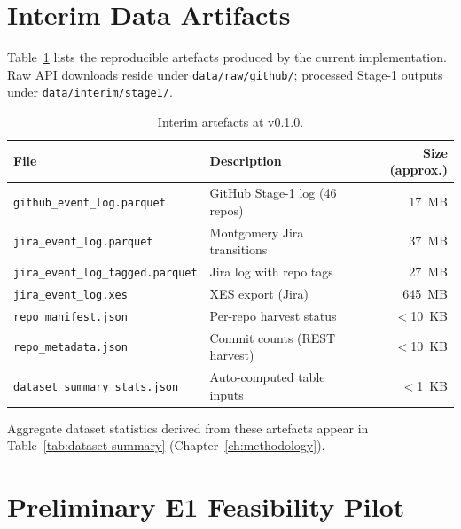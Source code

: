 \section{Interim Data Artifacts}
\label{sec:impl-artifacts}

Table~\ref{tab:impl-artifacts} lists the reproducible artefacts produced by
the current implementation. Raw API downloads reside under
\texttt{data/raw/github/}; processed Stage-1 outputs under
\texttt{data/interim/stage1/}.

\begin{table}[htbp]
\centering
\caption{Interim artefacts at v0.1.0.}
\label{tab:impl-artifacts}
\small
\begin{tabular}{llr}
\toprule
\textbf{File} & \textbf{Description} & \textbf{Size (approx.)} \\
\midrule
\texttt{github\_event\_log.parquet} & GitHub Stage-1 log (46 repos) & 17~MB \\
\texttt{jira\_event\_log.parquet}   & Montgomery Jira transitions  & 37~MB \\
\texttt{jira\_event\_log\_tagged.parquet} & Jira log with repo tags & 27~MB \\
\texttt{jira\_event\_log.xes}       & XES export (Jira)            & 645~MB \\
\texttt{repo\_manifest.json}        & Per-repo harvest status      & $<$10~KB \\
\texttt{repo\_metadata.json}        & Commit counts (REST harvest) & $<$10~KB \\
\texttt{dataset\_summary\_stats.json}& Auto-computed table inputs  & $<$1~KB \\
\bottomrule
\end{tabular}
\end{table}

Aggregate dataset statistics derived from these artefacts appear in
Table~\ref{tab:dataset-summary} (Chapter~\ref{ch:methodology}).


\section{Preliminary E1 Feasibility Pilot}
\label{sec:impl-e1-pilot}


